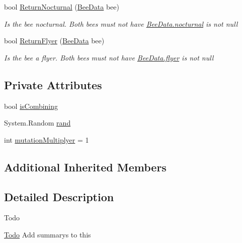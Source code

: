 \begin{DoxyCompactItemize}
\item 
bool \hyperlink{class_bee_game_1_1_bee_1_1_apiary_a88c438661490f5f8c0213353be1d5cac}{Return\+Nocturnal} (\hyperlink{struct_bee_game_1_1_bee_1_1_bee_data}{Bee\+Data} bee)
\begin{DoxyCompactList}\small\item\em Is the bee nocturnal. Both bees must not have \hyperlink{struct_bee_game_1_1_bee_1_1_bee_data_a4cd90eee8d255726d982116f14b444b2}{Bee\+Data.\+nocturnal} is not null \end{DoxyCompactList}\item 
bool \hyperlink{class_bee_game_1_1_bee_1_1_apiary_a3c794be5d19c1445f3a48ebc82d49980}{Return\+Flyer} (\hyperlink{struct_bee_game_1_1_bee_1_1_bee_data}{Bee\+Data} bee)
\begin{DoxyCompactList}\small\item\em Is the bee a flyer. Both bees must not have \hyperlink{struct_bee_game_1_1_bee_1_1_bee_data_af78a352321613693c3e94c98f655ac63}{Bee\+Data.\+flyer} is not null \end{DoxyCompactList}\end{DoxyCompactItemize}
\subsection*{Private Attributes}
\begin{DoxyCompactItemize}
\item 
bool \hyperlink{class_bee_game_1_1_bee_1_1_apiary_ae6f4b8692da57eba10d3b593430b2384}{is\+Combining}
\item 
System.\+Random \hyperlink{class_bee_game_1_1_bee_1_1_apiary_a272ac8b385ad3a7cd358b0959d561be7}{rand}
\item 
int \hyperlink{class_bee_game_1_1_bee_1_1_apiary_a0bdb20aaaa311091ddc2f4505dfdb17d}{mutation\+Multiplyer} = 1
\end{DoxyCompactItemize}
\subsection*{Additional Inherited Members}


\subsection{Detailed Description}


\begin{DoxyRefDesc}{Todo}
\item[\hyperlink{todo__todo000001}{Todo}]Add summarys to this \end{DoxyRefDesc}



